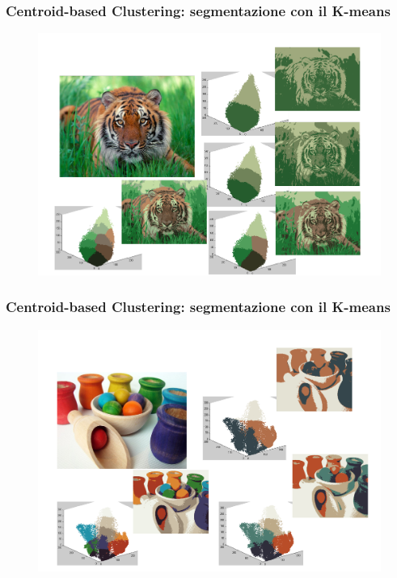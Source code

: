 \begin{frame}

	\frametitle{{\color{GradientDescentDiagramBlue}Centroid-based Clustering}: segmentazione con il K-means}

		\begin{figure}[!htbp]
			\centering
			\includegraphics[angle=0,width=0.8\linewidth]{images/unsupervised/kmeans/kmeans_lion.pdf}
		\end{figure}

\end{frame}


\begin{frame}

	\frametitle{{\color{GradientDescentDiagramBlue}Centroid-based Clustering}: segmentazione con il K-means}

		\begin{figure}[!htbp]
				\centering
				\includegraphics[angle=0,width=0.85\linewidth]{images/unsupervised/kmeans/kmeans_pots.pdf}
			\end{figure}

\end{frame}
